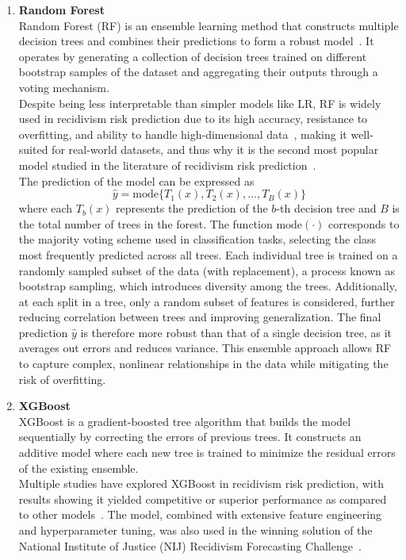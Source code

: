 \documentclass[12pt]{article}
\begin{document}
\begin{enumerate}
 \item \textbf{Random Forest}\\
  \tab Random Forest (RF) is an ensemble learning method that constructs multiple decision trees and combines their predictions to form a robust model~\cite{kovalchuk2023prediction}. It operates by generating a collection of decision trees trained on different bootstrap samples of the dataset and aggregating their outputs through a voting mechanism.\\
  
  Despite being less interpretable than simpler models like LR, RF is widely used in recidivism risk prediction due to its high accuracy, resistance to overfitting, and ability to handle high-dimensional data~\cite{kovalchuk2023prediction}, making it well-suited for real-world datasets, and thus why it is the second most popular model studied in the literature of recidivism risk prediction~\cite{travaini2022machine}.\\

  The prediction of the model can be expressed as \[\hat{y} = \text{mode}\{T_1(x), T_2(x), \dots, T_B(x)\} \] where each $ T_b(x) $ represents the prediction of the $b$-th decision tree and $B$ is the total number of trees in the forest. The function $\text{mode}(\cdot)$ corresponds to the majority voting scheme used in classification tasks, selecting the class most frequently predicted across all trees. Each individual tree is trained on a randomly sampled subset of the data (with replacement), a process known as bootstrap sampling, which introduces diversity among the trees. Additionally, at each split in a tree, only a random subset of features is considered, further reducing correlation between trees and improving generalization. The final prediction $\hat{y}$ is therefore more robust than that of a single decision tree, as it averages out errors and reduces variance. This ensemble approach allows RF to capture complex, nonlinear relationships in the data while mitigating the risk of overfitting.\\  

 \item \textbf{XGBoost}\\
  \tab XGBoost is a gradient-boosted tree algorithm that builds the model sequentially by correcting the errors of previous trees. It constructs an additive model where each new tree is trained to minimize the residual errors of the existing ensemble.\\
  
  Multiple studies have explored XGBoost in recidivism risk prediction, with results showing it yielded competitive or superior performance as compared to other models~\cite{won2019recidivism,rajendran2021predicting}. The model, combined with extensive feature engineering and hyperparameter tuning, was also used in the winning solution of the National Institute of Justice (NIJ) Recidivism Forecasting Challenge~\cite{han2022xgboost}. 
  

\end{enumerate}
\end{document}
